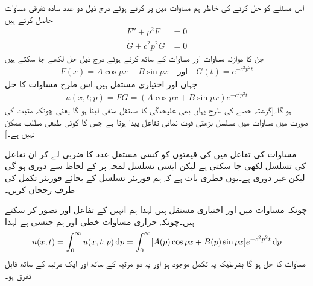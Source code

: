 اس مسئلے کو حل کرنے کی خاطر ہم مساوات  میں  پر کرتے ہوئے درج ذیل دو عدد سادہ تفرقی مساوات حاصل کرتے ہیں
\begin{align}
F''+p^2F&=0\label{مساوات_جزوی_حراری_لامتناہی_پ}\\
\dot{G}+c^2p^2G&=0\label{مساوات_جزوی_حراری_لامتناہی_ت}
\end{align} 
جن کا موازنہ مساوات  اور مساوات  کے ساتھ کرتے ہوئے درج ذیل حل لکھے جا سکتے ہیں
\begin{align*}
F(x)=A\cos px+B\sin px\quad \text{اور}\quad G(t)=e^{-c^2p^2t}
\end{align*}
جہاں  اور  اختیاری  مستقل ہیں۔اس طرح مساوات  کا حل
\begin{align}\label{مساوات_جزوی_حراری_لامتناہی_ٹ}
u(x,t;p)=FG=(A\cos px+B\sin px)e^{-c^2p^2t}
\end{align}
ہو گا۔[گزشتہ حصے کی طرح یہاں بھی علیحدگی کا مستقل  منفی لینا ہو گا یعنی  چونکہ مثبت  کی صورت میں مساوات  میں مسلسل بڑھتی قوت نمائی تفاعل پیدا ہوتا ہے جس کا کوئی طبعی مطلب ممکن نہیں ہے۔]

مساوات  کی تفاعل میں  کی قیمتوں کو کسی مستقل عدد کا ضربی  لے کر ان تفاعل کی تسلسل لکھی جا سکتی ہے لیکن ایسی تسلسل  لمحہ  پر  کے لحاظ سے دوری ہو گی لیکن  غیر دوری ہے۔یوں فطری بات ہے کہ ہم فوریئر تسلسل کے بجائے فوریئر تکمل کی طرف رجحان کریں۔

چونکہ مساوات  میں  اور  اختیاری مستقل ہیں لہٰذا  ہم انہیں  کے تفاعل  اور  تصور کر سکتے ہیں۔چونکہ حراری مساوات خطی اور ہم جنسی ہے لہٰذا
\begin{align}\label{مساوات_جزوی_حراری_لامتناہی_ث}
u(x,t)=\int_0^{\infty}u(x,t;p)\dif p=\int_0^{\infty}[A(p)\cos px+B(p)\sin px]e^{-c^2p^2t}\dif p
\end{align}
مساوات  کا حل ہو گا بشرطیکہ یہ تکمل موجود ہو اور یہ دو مرتبہ  کے ساتھ اور ایک مرتبہ  کے ساتھ قابل تفرق ہو۔


